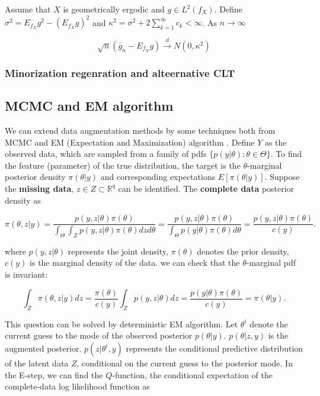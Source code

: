 \documentclass[12pt]{article}
\begin{document}
Assume that \(X\) is geometrically ergodic and \(g\in L^2(f_X)\). Define
\(\sigma^2=E_{f_{X}}g^2-(E_{f_{X}}g)^2\) and
\(\kappa^2=\sigma^2+2\sum_{k=1}^\infty c_k< \infty\). As \(n\to\infty\)

\[\sqrt{n}(\bar g_n-E_{f_{X}}g)\overset{d}{\to}N(0,\kappa^2)\]

\hypertarget{minorization-regenration-and-alteernative-clt}{%
\subsubsection{Minorization regenration and alteernative
CLT}\label{minorization-regenration-and-alteernative-clt}}

\subsection{MCMC and EM algorithm}
\label{sec:latent}

We can extend data augmentation methods by some techniques both from
MCMC and EM (Expectation and Maximization) algorithm
\citep{mclachlanEMAlgorithmExtensions2008}. Define \(Y\) as the observed
data, which are sampled from a family of pdfs
\(\{p(y|\theta):\theta\in \Theta\}\). To find the feature (parameter) of
the true distribution, the target is the \(\theta\)-marginal posterior
density \(\pi(\theta|y)\) and corresponding expectations
\(E[\pi(\theta|y)]\). Suppose the \textbf{missing data},
\(z\in Z\subset \mathbb{R}^q\) can be identified. The \textbf{complete
data} posterior density as

\[\pi(\theta,z|y)=\frac{p(y,z|\theta)\pi(\theta)}{\int_\Theta\int_{Z}p(y,z|\theta)\pi(\theta)dzd\theta}=\frac{p(y,z|\theta)\pi(\theta)}{\int_{\Theta}p(y|\theta)\pi(\theta)d\theta}=\frac{p(y,z|\theta)\pi(\theta)}{c(y)}.\]

where \(p(y,z|\theta)\) represents the joint density, \(\pi(\theta)\)
denotes the prior density, \(c(y)\) is the marginal density of the data.
we can check that the \(\theta\)-marginal pdf is invariant:

\[\int_{Z}\pi(\theta,z|y)dz=\frac{\pi(\theta)}{c(y)}\int_{Z}p(y,z|\theta)dz=\frac{p(y|\theta)\pi(\theta)}{c(y)}=\pi(\theta|y).\]

This question can be solved by deterministic EM algorithm. Let
\(\theta^{i}\) denote the current guess to the mode of the observed
posterior \(p(\theta|y)\). \(p(\theta|z,y)\) is the augmented posterior.
\(p(z|\theta^{i},y)\) represents the conditional predictive distribution
of the latent data \(Z\), conditional on the current guess to the
posterior mode. In the E-step, we can find the \(Q\)-function, the
conditional expectation of the complete-data log likelihood function as
\end{document}
